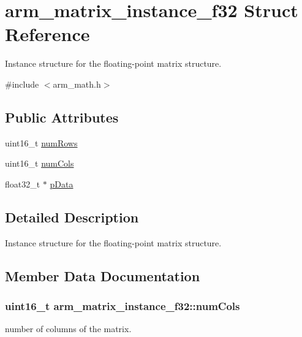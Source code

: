 \hypertarget{structarm__matrix__instance__f32}{}\section{arm\+\_\+matrix\+\_\+instance\+\_\+f32 Struct Reference}
\label{structarm__matrix__instance__f32}


Instance structure for the floating-\/point matrix structure.  




{\ttfamily \#include $<$arm\+\_\+math.\+h$>$}

\subsection*{Public Attributes}
\begin{DoxyCompactItemize}
\item 
uint16\+\_\+t \hyperlink{structarm__matrix__instance__f32_a23f4e34d70a82c9cad7612add5640b7b}{num\+Rows}
\item 
uint16\+\_\+t \hyperlink{structarm__matrix__instance__f32_acdd1fb73734df68b89565c54f1dd8ae2}{num\+Cols}
\item 
float32\+\_\+t $\ast$ \hyperlink{structarm__matrix__instance__f32_af3917c032600a9dfd5ed4a96f074910a}{p\+Data}
\end{DoxyCompactItemize}


\subsection{Detailed Description}
Instance structure for the floating-\/point matrix structure. 

\subsection{Member Data Documentation}
\subsubsection[{\texorpdfstring{num\+Cols}{numCols}}]{\setlength{\rightskip}{0pt plus 5cm}uint16\+\_\+t arm\+\_\+matrix\+\_\+instance\+\_\+f32\+::num\+Cols}\hypertarget{structarm__matrix__instance__f32_acdd1fb73734df68b89565c54f1dd8ae2}{}\label{structarm__matrix__instance__f32_acdd1fb73734df68b89565c54f1dd8ae2}
number of columns of the matrix. 
